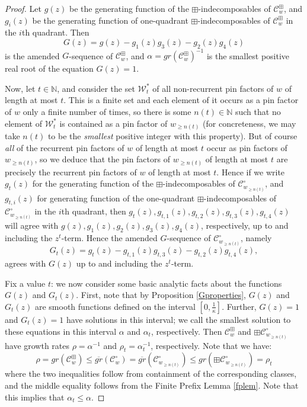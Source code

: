 \documentclass[11pt,a4paper]{article}
\theoremstyle{definition}
\begin{document}
\begin{proof}
Let $g(z)$ be the generating function of the $\boxplus$-indecomposables of $\mathcal{C}^{\boxplus}_{w}$, and $g_{i}(z)$ be the generating function of one-quadrant $\boxplus$-indecomposables of $\mathcal{C}^{\boxplus}_{w}$ in the $i$th quadrant. Then
\[
G(z) = g(z) - g_{1}(z)g_{3}(z) - g_{2}(z)g_{4}(z)
\]
is the amended $G$-sequence of $\mathcal{C}^{\boxplus}_{w}$, and $\alpha = gr(\mathcal{C}^{\boxplus}_{w})^{-1}$ is the smallest positive real root of the equation $G(z) = 1$.

Now, let $t \in \mathbb{N}$, and consider the set $\mathcal{W}^{*}_{t}$ of all non-recurrent pin factors of $w$ of length at most $t$. This is a finite set and each element of it occurs as a pin factor of $w$ only a finite number of times, so there is some $n(t) \in \mathbb{N}$ such that no element of $\mathcal{W}^{*}_{t}$ is contained as a pin factor of $w_{\geq n(t)}$ (for concreteness, we may take $n(t)$ to be the \emph{smallest} positive integer with this property). But of course \emph{all} of the recurrent pin factors of $w$ of length at most $t$ occur as pin factors of $w_{\geq n(t)}$, so we deduce that the pin factors of $w_{\geq n(t)}$ of length at most $t$ are precisely the recurrent pin factors of $w$ of length at most $t$. Hence if we write $g_{t}(z)$ for the generating function of the $\boxplus$-indecomposables of $\mathcal{C}^{\circ}_{w_{\geq n(t)}}$, and $g_{t, i}(z)$ for generating function of the one-quadrant $\boxplus$-indecomposables of $\mathcal{C}^{\circ}_{w_{\geq n(t)}}$ in the $i$th quadrant, then $g_{t}(z), g_{t,1}(z), g_{t,2}(z), g_{t,3}(z), g_{t,4}(z)$ will agree with $g(z), g_{1}(z), g_{2}(z), g_{3}(z), g_{4}(z)$, respectively, up to and including the $z^{t}$-term. Hence the amended $G$-sequence of $\mathcal{C}^{\circ}_{w_{\geq n(t)}}$, namely
\[
G_{t}(z) = g_{t}(z) - g_{t,1}(z)g_{t,3}(z) - g_{t,2}(z)g_{t,4}(z) ,
\]
agrees with $G(z)$ up to and including the $z^{t}$-term.

Fix a value $t$: we now consider some basic analytic facts about the functions $G(z)$ and $G_{t}(z)$. First, note that by Proposition \ref{Gproperties}, $G(z)$ and $G_{t}(z)$ are smooth functions defined on the interval $\left[0,\frac{1}{\kappa}\right]$. Further, $G(z) = 1$ and $G_{t}(z) = 1$ have solutions in this interval; we call the smallest solution to these equations in this interval $\alpha$ and $\alpha_{t}$, respectively. Then $\mathcal{C}^{\boxplus}_{w}$ and $\boxplus\mathcal{C}^{\circ}_{w_{\geq n(t)}}$ have growth rates $\rho = \alpha^{-1}$ and $\rho_{t} = \alpha^{-1}_{t}$, respectively. Note that we have:
\[
\rho = gr(\mathcal{C}^{\boxplus}_{w}) \leq \overline{gr}(\mathcal{C}^{\circ}_{w}) = \overline{gr}(\mathcal{C}^{\circ}_{w_{\geq n(t)}}) \leq gr(\boxplus\mathcal{C}^{\circ}_{w_{\geq n(t)}}) = \rho_{t}
\]
where the two inequalities follow from containment of the corresponding classes, and the middle equality follows from the Finite Prefix Lemma \ref{fplem}. Note that this implies that $\alpha_{t} \leq \alpha$. 


\end{proof}
\end{document}
